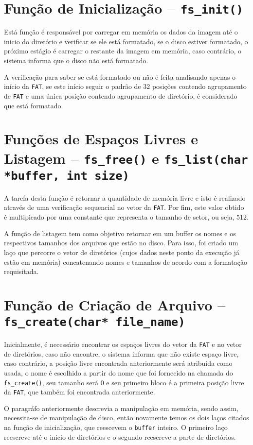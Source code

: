 \documentclass[11pt]{article}
\begin{document}
\section{Função de Inicialização --  \texttt{fs\_init()}}
\par
Está função é responsável por carregar em memória os dados da imagem até o inicio do diretório e verificar se ele está formatado, se o disco estiver formatado, o próximo estágio é carregar o restante da imagem em memória, caso contrário, o sistema informa que o disco não está formatado.
\par
A verificação para saber se está formatado ou não é feita analisando apenas o início da \texttt{FAT}, se este início seguir o padrão de 32 posições contendo agrupamento de \texttt{FAT} e uma única posição contendo agrupamento de diretório, é considerado que está formatado.

\section{Funções de Espaços Livres e Listagem --  \texttt{fs\_free()} e  \texttt{fs\_list(char *buffer, int size)}}


A tarefa desta função é retornar a quantidade de memória livre e isto é realizado através de uma verificação sequencial no vetor da \texttt{FAT}. Por fim, este valor obtido é multipicado por uma constante que representa o tamanho de setor, ou seja, 512.


A função de listagem tem como objetivo retornar em um buffer os nomes e os respectivos tamanhos dos arquivos que estão no disco. Para isso, foi criado um laço que percorre o vetor de diretórios (cujos dados neste ponto da execução já estão em memória) concatenando nomes e tamanhos de acordo com a formatação requisitada. 

\section{Função de Criação de Arquivo -- \texttt{fs\_create(char* file\_name)}}
\par
Inicialmente, é necessário encontrar os espaços livres do vetor da \texttt{FAT} e no vetor de diretórios, caso não encontre, o sistema informa que não existe espaço livre, caso contrário, a posição livre encontrada anteriormente será atribuida como usada, o nome é escolhido a partir do nome que foi fornecido na chamada do \texttt{fs\_create()}, seu tamanho será 0 e seu primeiro bloco é a primeira posição livre da \texttt{FAT}, que também foi encontrada anteriormente.
\par
O paragráfo anteriormente descrevia a manipulação em memória, sendo assim, necessita-se de manipulação de disco, então novamente temos os dois laços citados na função de inicialização, que reescevem o \texttt{buffer} inteiro. O primeiro laço reescreve até o inicio de diretórios e o segundo reescreve a parte de diretórios.
\end{document}
